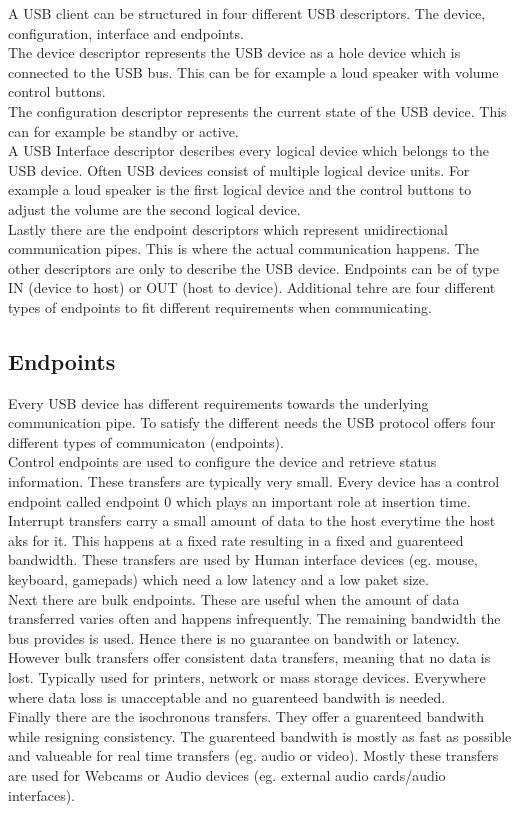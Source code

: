 A USB client can be structured in four different USB descriptors. The device, configuration, interface and endpoints.\\
The device descriptor represents the USB device as a hole device which is connected to the USB bus. This can be for example a loud speaker with volume control buttons.\\
The configuration descriptor represents the current state of the USB device. This can for example be standby or active.\\
A USB Interface descriptor describes every logical device which belongs to the USB device. Often USB devices consist of multiple logical device units. For example a loud speaker is the first logical device and the control buttons to adjust the volume are the second logical device.\\
Lastly there are the endpoint descriptors which represent unidirectional communication pipes. This is where the actual communication happens. The other descriptors are only to describe the USB device. Endpoints can be of type IN (device to host) or OUT (host to device). Additional tehre are four different types of endpoints to fit different requirements when communicating.\\

\subsection{Endpoints}

Every USB device has different requirements towards the underlying communication pipe. To satisfy the different needs the USB protocol offers four different types of communicaton (endpoints).\\
Control endpoints are used to configure the device and retrieve status information. These transfers are typically very small. Every device has a control endpoint called endpoint 0 which plays an important role at insertion time.\\
Interrupt transfers carry a small amount of data to the host everytime the host aks for it. This happens at a fixed rate resulting in a fixed and guarenteed bandwidth. These transfers are used by Human interface devices (eg. mouse, keyboard, gamepads) which need a low latency and a low paket size.\\
Next there are bulk endpoints. These are useful when the amount of data transferred varies often and happens infrequently. The remaining bandwidth the bus provides is used. Hence there is no guarantee on bandwith or latency. However bulk transfers offer consistent data transfers, meaning that no data is lost. Typically used for printers, network or mass storage devices. Everywhere where data loss is unacceptable and no guarenteed bandwith is needed.\\
Finally there are the isochronous transfers. They offer a guarenteed bandwith while resigning consistency. The guarenteed bandwith is mostly as fast as possible and valueable for real time transfers (eg. audio or video). Mostly these transfers are used for Webcams or Audio devices (eg. external audio cards/audio interfaces).\\

